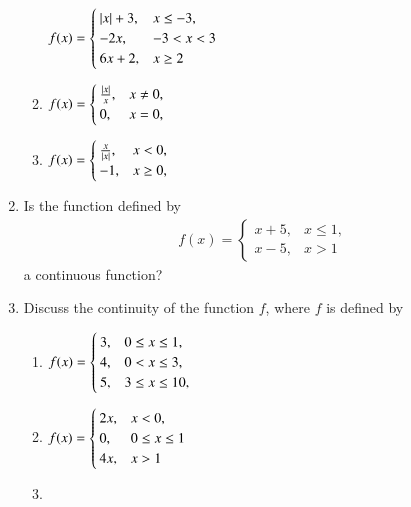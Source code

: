 \begin{enumerate}[label=\arabic*.,ref=\thesubsection.\theenumi]
\begin{enumerate}
$
\begin{alignedat}[t]{2}
f(x)=
\begin{cases}
\left\vert x\right\vert+3, & x \le -3,
\\
-2x, & -3 < x < 3
\\
6x+2, & x \ge 2
\end{cases}
\end{alignedat}
$
\item 
$
\begin{alignedat}[t]{2}
f(x)=
\begin{cases}
\frac{\left\vert x\right\vert}{x}, & x \ne 0,
\\
0, & x = 0,
\end{cases}
\end{alignedat}
$
\item 
$
\begin{alignedat}[t]{2}
f(x)=
\begin{cases}
\frac{x}{\left\vert x\right\vert}, & x < 0,
\\
-1, & x \ge 0,
\end{cases}
\end{alignedat}
$
\end{enumerate}
%
\item Is the function defined by 
%
\begin{align}
f(x)=
\begin{cases}
x+5, & x \le 1,
\\
x-5, & x > 1
\end{cases}
\end{align}
%
a continuous function?
\item Discuss the continuity of the function $f$, where $f$ is defined by 
\begin{enumerate}
\item 
$
\begin{alignedat}[t]{2}
f(x)=
\begin{cases}
3, & 0 \le x \le 1,
\\
4, & 0 < x \le 3,
\\
5, & 3 \le x \le 10,
\end{cases}
\end{alignedat}
$
%
\item 
$
\begin{alignedat}[t]{2}
f(x)=
\begin{cases}
2x, & x < 0,
\\
0, & 0 \le x \le 1
\\
4x, &  x > 1
\end{cases}
\end{alignedat}
$
\item 

\end{enumerate}
\end{enumerate}
